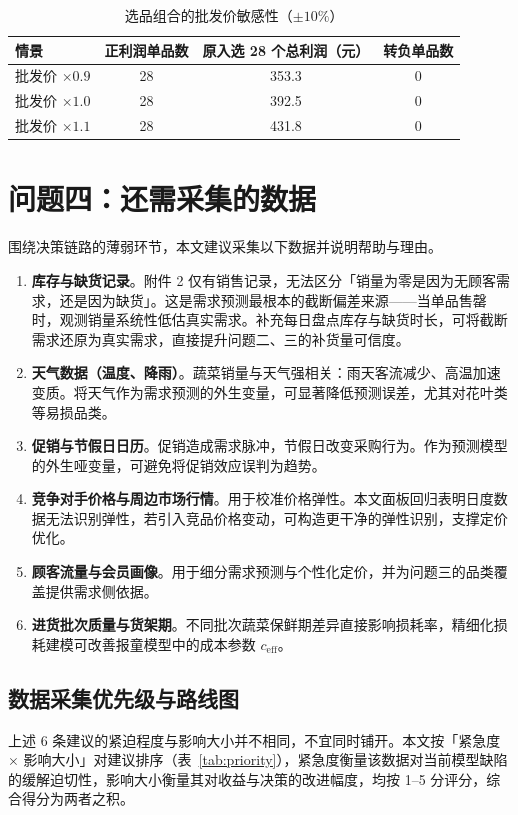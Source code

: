 \documentclass[12pt]{ctexart}
\begin{document}
\begin{table}[htbp]
\centering
\caption{选品组合的批发价敏感性（$\pm10\%$）}
\label{tab:robustness}
\begin{tabular}{lccc}
\toprule
情景 & 正利润单品数 & 原入选 28 个总利润（元） & 转负单品数 \\
\midrule
批发价 $\times 0.9$ & 28 & 353.3 & 0 \\
批发价 $\times 1.0$ & 28 & 392.5 & 0 \\
批发价 $\times 1.1$ & 28 & 431.8 & 0 \\
\bottomrule
\end{tabular}
\end{table}

\section{问题四：还需采集的数据}

围绕决策链路的薄弱环节，本文建议采集以下数据并说明帮助与理由。

\begin{enumerate}
\item \textbf{库存与缺货记录}。附件 2 仅有销售记录，无法区分「销量为零是因为无顾客需求，还是因为缺货」。这是需求预测最根本的截断偏差来源——当单品售罄时，观测销量系统性低估真实需求。补充每日盘点库存与缺货时长，可将截断需求还原为真实需求，直接提升问题二、三的补货量可信度。
\item \textbf{天气数据（温度、降雨）}。蔬菜销量与天气强相关：雨天客流减少、高温加速变质。将天气作为需求预测的外生变量，可显著降低预测误差，尤其对花叶类等易损品类。
\item \textbf{促销与节假日日历}。促销造成需求脉冲，节假日改变采购行为。作为预测模型的外生哑变量，可避免将促销效应误判为趋势。
\item \textbf{竞争对手价格与周边市场行情}。用于校准价格弹性。本文面板回归表明日度数据无法识别弹性，若引入竞品价格变动，可构造更干净的弹性识别，支撑定价优化。
\item \textbf{顾客流量与会员画像}。用于细分需求预测与个性化定价，并为问题三的品类覆盖提供需求侧依据。
\item \textbf{进货批次质量与货架期}。不同批次蔬菜保鲜期差异直接影响损耗率，精细化损耗建模可改善报童模型中的成本参数 $c_{\mathrm{eff}}$。
\end{enumerate}

\subsection{数据采集优先级与路线图}
上述 6 条建议的紧迫程度与影响大小并不相同，不宜同时铺开。本文按「紧急度 $\times$ 影响大小」对建议排序（表~\ref{tab:priority}），紧急度衡量该数据对当前模型缺陷的缓解迫切性，影响大小衡量其对收益与决策的改进幅度，均按 1--5 分评分，综合得分为两者之积。
\end{document}
